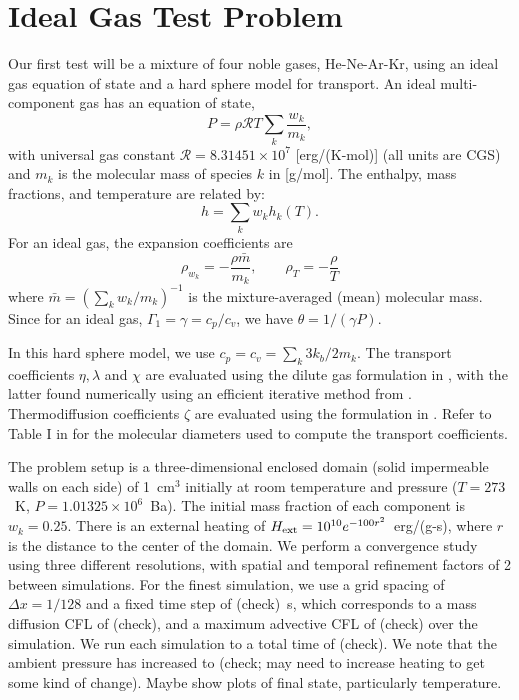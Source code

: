 \documentclass[final]{siamltex}
\def\Hext {H_{\rm ext}}
\begin{document}
\section{Ideal Gas Test Problem}
Our first test will be a mixture of four noble gases, He-Ne-Ar-Kr,
using an ideal gas equation of state and a hard sphere model for transport.
An ideal multi-component gas has an equation of state,
\begin{equation}
P = \rho\mathcal{R}T\sum_k\frac{w_k}{m_k},
\end{equation}
with universal gas constant $\mathcal{R} = 8.31451\times 10^7$ [erg/(K-mol)] 
(all units are CGS) and $m_k$ is the molecular mass of species $k$ in [g/mol].
The enthalpy, mass fractions, and temperature are related by:
\begin{equation}
h = \sum_k w_k h_k(T).
\end{equation}
For an ideal gas, the expansion coefficients are
\begin{equation}
\rho_{w_k} = -\frac{\rho\bar{m}}{m_k}, \qquad
\rho_T = -\frac{\rho}{T}
\end{equation}
where $\bar{m} = (\sum_k w_k/m_k)^{-1}$ is the mixture-averaged (mean) molecular mass.  Since for an ideal gas, $\Gamma_1 = \gamma = c_p/c_v$, we have
$\theta = 1/(\gamma P)$.

In this hard sphere model, we use $c_p = c_v = \sum_k 3k_b/2m_k$.
The transport coefficients $\eta,\lambda$ and $\chi$ are evaluated using the 
dilute gas formulation in \cite{Hirschfelder54}, with the latter found numerically
using an efficient iterative method from \cite{Giovangigli99}.
Thermodiffusion coefficients $\zeta$ are evaluated using the formulation in \cite{Valk}.
Refer to Table I in \cite{LLNS} for the molecular diameters used to compute
the transport coefficients.

The problem setup is a three-dimensional enclosed domain (solid impermeable 
walls on each side) of 1~cm$^3$ initially at room temperature and pressure
($T=273$~K, $P=1.01325\times 10^6$~Ba).  The initial mass fraction of each component
is $w_k = 0.25$.  There is an external heating of $\Hext=10^{10}e^{-100r^2}$~erg/(g-s),
where $r$ is the distance to the center of the domain.  We perform a convergence
study using three different resolutions, with spatial and temporal refinement
factors of 2 between simulations.  For the finest simulation, we use a grid
spacing of $\Delta x = 1/128$ and a fixed time step
of (check)~s, which corresponds to a mass diffusion CFL of (check), and
a maximum advective CFL of (check) over the simulation.
We run each simulation to a total time of (check).
We note that the ambient pressure has increased to (check; may need to increase heating
to get some kind of change).  Maybe show plots of final state, particularly temperature.
\end{document}
